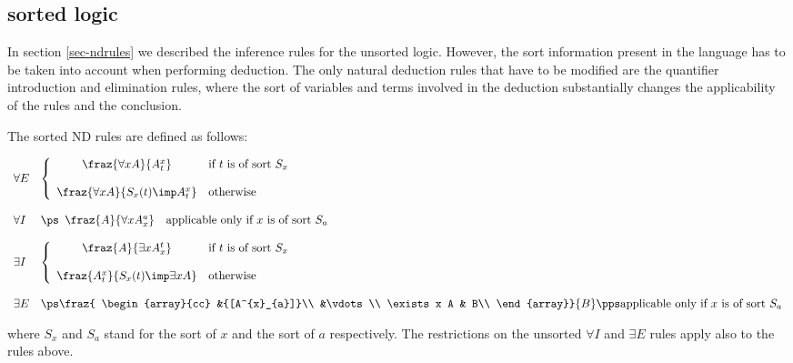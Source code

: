 \renewcommand{\arraystretch}{1}


\subsection{{\GF} sorted logic}

In section \ref{sec-ndrules} we described the inference rules for the unsorted
logic. 
However, the sort information present in the language has to be taken into
account when performing deduction.
The only natural deduction rules that have to be modified are the quantifier
introduction and elimination rules, where the sort of variables and terms
involved in the deduction substantially changes the applicability of the rules
and the conclusion.

The sorted ND rules are defined as follows:

$$
\begin{array}{ll}
\forall E & \left\{
\begin{array}{cl}
\fraz{\forall x A}{A^{x}_{t}} &
\mbox{if $t$ is of sort $S_x$} \\
& \\
\fraz{\forall x A}{S_x(t)\imp A^x_t} & \mbox{otherwise}
\end{array}
\right. %
\\

& \\

\forall I & \ps
\begin{array}{cl}
\fraz{A}
     {\forall x A^{a}_{x}}
& \mbox{applicable only if $x$ is of sort $S_a$}
\end{array} \\

& \\

\exists I & \left\{
\begin{array}{cl}
\fraz{A}
     {\exists x A^{t}_{x}}
& \mbox{if $t$ is of sort $S_x$} \\
& \\
\fraz{A^x_t}{S_x(t)\imp\exists x A}
& \mbox{otherwise}
\end{array} 
\right. %
\\

& \\
\exists E & \ps
\fraz{
\begin{array}{cc}
&{[A^{x}_{a}]}\\
&\vdots\\
\exists x A & B\\
\end{array}}
{B}
\pps
\mbox{applicable only if $x$ is of sort $S_a$}

\end{array}
$$

where $S_x$ and $S_a$ stand for the sort of $x$ and the sort of $a$
respectively.
The restrictions on the unsorted $\forall I$ and $\exists E$  rules apply also
to the rules above. 
